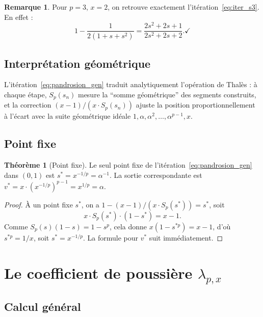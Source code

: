 \documentclass[11pt,a4paper]{article}
\theoremstyle{definition}
\newtheorem{theorem}{Théorème}[section]
\newtheorem{remark}{Remarque}[section]
\begin{document}
\begin{remark}
Pour $p = 3$, $x = 2$, on retrouve exactement l'itération~\eqref{eq:iter_s3}. En effet :
\[
  1 - \frac{1}{2(1+s+s^2)} = \frac{2s^2+2s+1}{2s^2+2s+2}. \checkmark
\]
\end{remark}

\subsection{Interprétation géométrique}

L'itération~\eqref{eq:pandrosion_gen} traduit analytiquement l'opération de Thalès : à chaque étape, $S_p(s_n)$ mesure la ``somme géométrique'' des segments construits, et la correction $(x-1)/(x \cdot S_p(s_n))$ ajuste la position proportionnellement à l'écart avec la suite géométrique idéale $1, \alpha, \alpha^2, \ldots, \alpha^{p-1}, x$.

\subsection{Point fixe}

\begin{theorem}[Point fixe]
\label{thm:fixed_point}
Le seul point fixe de l'itération~\eqref{eq:pandrosion_gen} dans $(0,1)$ est $s^* = x^{-1/p} = \alpha^{-1}$. La sortie correspondante est $v^* = x \cdot (x^{-1/p})^{p-1} = x^{1/p} = \alpha$.
\end{theorem}

\begin{proof}
À un point fixe $s^*$, on a $1 - (x-1)/(x \cdot S_p(s^*)) = s^*$, soit
\[
  x \cdot S_p(s^*) \cdot (1 - s^*) = x - 1.
\]
Comme $S_p(s)(1-s) = 1 - s^p$, cela donne $x(1 - s^{*p}) = x - 1$, d'où $s^{*p} = 1/x$, soit $s^* = x^{-1/p}$. La formule pour $v^*$ suit immédiatement.
\end{proof}

\section{Le coefficient de poussière \texorpdfstring{$\lambda_{p,x}$}{lambda}}
\label{sec:coefficient}

\subsection{Calcul général}
\end{document}

